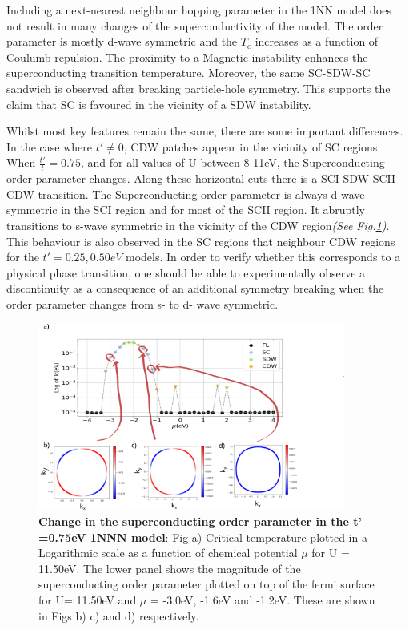 \documentclass[12pt]{article}
\begin{document}
Including a next-nearest neighbour hopping parameter in the 1NN model does not result in
many changes of the superconductivity of the model. The order parameter is mostly d-wave symmetric and the $T_c$ increases
as a function of Coulumb repulsion. The proximity to a Magnetic instability enhances the superconducting transition temperature.
Moreover, the same SC-SDW-SC sandwich is observed after breaking particle-hole symmetry. This supports the claim that SC is favoured in the vicinity
of a SDW instability. \par
\medskip
\noindent Whilst most key features remain the same, there are some important differences. 
In the case where $t' \neq 0 $, CDW patches appear in the vicinity of SC regions.
When $\frac{t'}{t} = 0.75$, and for all values of U between 8-11eV, the Superconducting order parameter changes.
Along these horizontal cuts there is a SCI-SDW-SCII-CDW transition. The Superconducting order parameter 
is always d-wave symmetric in the SCI region and for most of the SCII region. It abruptly transitions to 
s-wave symmetric in the vicinity of the CDW region\textit{(See Fig.\ref{fig:1NNNSC})}. This behaviour is also observed in the SC regions that neighbour CDW regions for 
the $t' = 0.25, 0.50eV$ models. In order to verify whether this corresponds to a physical phase transition, one should be able to experimentally observe a 
discontinuity as a consequence of an additional symmetry breaking when the order parameter changes from s- to d- wave symmetric.
 

\begin{figure}[htbp]  %
    \centering
    \includegraphics[width=0.90\textwidth]{1NNNSC_075.png}  %
    \caption{\textbf{Change in the superconducting order parameter in the t' =0.75eV 1NNN model}: Fig a) Critical temperature plotted in a Logarithmic scale
    as a function of chemical potential $\mu$ for U = 11.50eV.
    The lower panel shows the magnitude of the superconducting order parameter plotted on top of the fermi surface for U= 11.50eV and $\mu$ = -3.0eV, -1.6eV and -1.2eV. These are shown in Figs b)
    c) and d) respectively.  }
    \label{fig:1NNNSC}
\end{figure}
\end{document}
